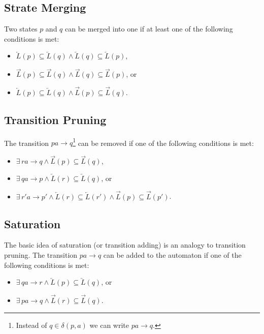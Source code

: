    \subsection{Strate Merging}
        Two states $p$ and $q$ can be merged into one if at least one of the following conditions is met:
        \begin{itemize}
            \item $\overleftarrow{L}(p) \subseteq \overleftarrow{L}(q) \land \overleftarrow{L}(q) \subseteq \overleftarrow{L}(p)$,
            \item $\overrightarrow{L}(p) \subseteq \overrightarrow{L}(q) \land \overrightarrow{L}(q) \subseteq \overrightarrow{L}(p)$, or
            \item $\overleftarrow{L}(p) \subseteq \overleftarrow{L}(q) \land \overrightarrow{L}(p) \subseteq \overrightarrow{L}(q)$.
        \end{itemize}

    \subsection{Transition Pruning}
        The transition $pa \rightarrow q$\footnote{Instead of $q \in \delta(p, a)$ we can write $pa \rightarrow q$.} can be removed if one of the following conditions is met:
        \begin{itemize}
            \item $\exists\, ra\rightarrow q \land \overrightarrow{L}(p) \subseteq \overrightarrow{L}(q)$,
            \item $\exists\, qa\rightarrow p \land \overleftarrow{L}(r) \subseteq \overleftarrow{L}(q)$, or
            \item $\exists\, r'a\rightarrow p' \land \overleftarrow{L}(r) \subseteq \overleftarrow{L}(r') \land \overrightarrow{L}(p) \subseteq \overrightarrow{L}(p')$.
        \end{itemize}

    \subsection{Saturation}
        The basic idea of saturation (or transition adding) is an analogy to transition pruning. The transition $pa \rightarrow q$ can be added to the automaton if one of the following conditions is met:
        \begin{itemize}
        \item $\exists\, qa\rightarrow r \land \overleftarrow{L}(p) \subseteq \overleftarrow{L}(q)$, or
        \item $\exists\, pa\rightarrow q \land \overrightarrow{L}(r) \subseteq \overrightarrow{L}(q)$.
        \end{itemize}

